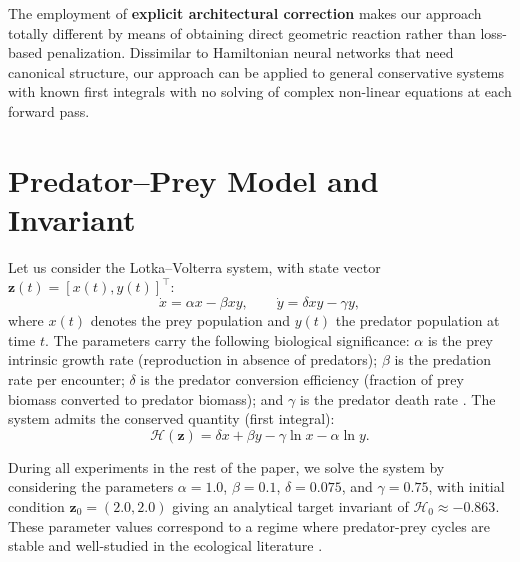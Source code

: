 \documentclass[pdflatex,sn-mathphys-num]{sn-jnl}
\theoremstyle{thmstyleone}%
\theoremstyle{thmstyletwo}%
\theoremstyle{thmstylethree}%
\begin{document}
	The employment of \textbf{explicit architectural correction} makes our approach totally different by means of obtaining direct geometric reaction rather than loss-based penalization. Dissimilar to Hamiltonian neural networks that need canonical structure, our approach can be applied to general conservative systems with known first integrals with no solving of complex non-linear equations at each forward pass.
	
	\section{Predator--Prey Model and Invariant}\label{sec3}
	
	Let us consider the Lotka--Volterra system, with state vector $\mathbf{z}(t) = [x(t), y(t)]^{\top}$:
	\begin{equation}
	\dot{x} = \alpha x - \beta xy, \qquad
	\dot{y} = \delta xy - \gamma y,
	\label{eq:LV}
	\end{equation}
	where $x(t)$ denotes the prey population and $y(t)$ the predator population at time $t$. The parameters carry the following biological significance: $\alpha$ is the prey intrinsic growth rate (reproduction in absence of predators); $\beta$ is the predation rate per encounter; $\delta$ is the predator conversion efficiency (fraction of prey biomass converted to predator biomass); and $\gamma$ is the predator death rate \cite{murray2002mathematical}. The system admits the conserved quantity (first integral):
	\begin{equation}
	\mathcal{H}(\mathbf{z}) = \delta x + \beta y - \gamma \ln x - \alpha \ln y.
	\label{eq:invariant}
	\end{equation}
	
	During all experiments in the rest of the paper, we solve the system by considering the parameters $\alpha=1.0$, $\beta=0.1$, $\delta=0.075$, and $\gamma=0.75$, with initial condition $\mathbf{z}_0 = (2.0,2.0)$ giving an analytical target invariant of $\mathcal{H}_0 \approx -0.863$. These parameter values correspond to a regime where predator-prey cycles are stable and well-studied in the ecological literature \cite{murray2002mathematical}.
	
\end{document}
